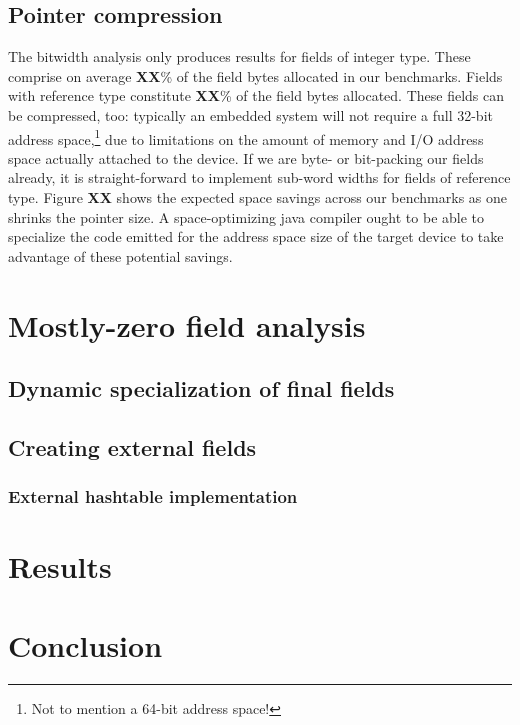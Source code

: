 \documentclass[preprint]{acmconf}
\begin{document}
\subsection{Pointer compression}
The bitwidth analysis only produces results for fields of integer type.
These comprise on average {\bf XX}\% of the field bytes allocated in
our benchmarks.  Fields with reference type constitute {\bf XX}\% of
the field bytes allocated.  These fields can be compressed, too:
typically an embedded system will not require a full 32-bit address
space,\footnote{Not to mention a 64-bit address space!} due to
limitations on the amount of memory and I/O address space actually attached
to the device.  If we are byte- or bit-packing our fields already,
it is straight-forward to implement sub-word widths for fields of
reference type.  Figure {\bf XX} shows the expected space savings
across our benchmarks as one shrinks the pointer size.  A
space-optimizing java compiler ought to be able to specialize the code
emitted for the address space size of the target device to take
advantage of these potential savings.

\section{Mostly-zero field analysis}
\subsection{Dynamic specialization of final fields}
\subsection{Creating external fields}
\subsubsection{External hashtable implementation}

\section{Results}
\section{Conclusion}




%
\end{document}
